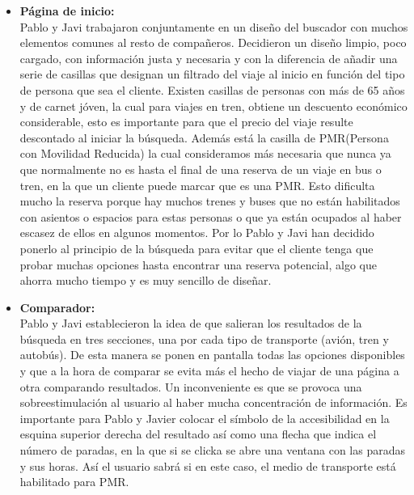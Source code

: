 \begin{itemize}
    \item\textbf{Página de inicio:} \\ Pablo y Javi trabajaron conjuntamente en un diseño del buscador con muchos elementos comunes al resto de compañeros. Decidieron un diseño limpio, poco cargado, con información justa y necesaria y con la diferencia de añadir una serie de casillas que designan un filtrado del viaje al inicio en función del tipo de persona que sea el cliente. Existen casillas de personas con más de 65 años y de carnet jóven, la cual para viajes en tren, obtiene un descuento económico considerable, esto es importante para que el precio del viaje resulte descontado al iniciar la búsqueda. Además está la casilla de PMR(Persona con Movilidad Reducida) la cual consideramos más necesaria que nunca ya que normalmente no es hasta el final de una reserva de un viaje en bus o tren, en la que un cliente puede marcar que es una PMR. Esto dificulta mucho la reserva porque hay muchos trenes y buses que no están habilitados con asientos o espacios para estas personas o que ya están ocupados al haber escasez de ellos en algunos momentos. Por lo Pablo y Javi han decidido ponerlo al principio de la búsqueda para evitar que el cliente tenga que probar muchas opciones hasta encontrar una reserva potencial, algo que ahorra mucho tiempo y es muy sencillo de diseñar.
    
    \item\textbf{Comparador:} \\ Pablo y Javi establecieron la idea de que salieran los resultados de la búsqueda en tres secciones, una por cada tipo de transporte (avión, tren y autobús). De esta manera se ponen en pantalla todas las opciones disponibles y que a la hora de comparar se evita más el hecho de viajar de una página a otra comparando resultados. Un inconveniente es que se provoca una sobreestimulación al usuario al haber mucha concentración de información.
    Es importante para Pablo y Javier colocar el símbolo de la accesibilidad en la esquina superior derecha del resultado así como una flecha que indica el número de paradas, en la que si se clicka se abre una ventana con las paradas y sus horas. Así el usuario sabrá si en este caso, el medio de transporte está habilitado para PMR.
    

\end{itemize}
